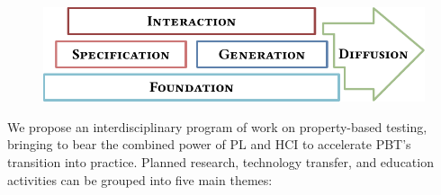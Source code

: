 \medskip

\begin{figure}
  \vspace*{-2ex}
  \centering
  \includegraphics[width=.6\textwidth]{assets/overview.pdf}
\end{figure}
%
We propose an interdisciplinary program of work on
{property-based testing}, bringing to
bear the combined power of PL and HCI to accelerate PBT's transition
into practice.
%
Planned research,
technology transfer, and education activities can be grouped into five main
themes: \iflater{}\fi
%
